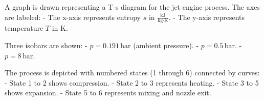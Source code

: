 A graph is drawn representing a T-s diagram for the jet engine process. The axes are labeled:  
- The x-axis represents entropy \( s \) in \( \frac{\text{kJ}}{\text{kg·K}} \).  
- The y-axis represents temperature \( T \) in \( \text{K} \).  

Three isobars are shown:  
- \( p = 0.191 \, \text{bar} \) (ambient pressure).  
- \( p = 0.5 \, \text{bar} \).  
- \( p = 8 \, \text{bar} \).  

The process is depicted with numbered states (1 through 6) connected by curves:  
- State 1 to 2 shows compression.  
- State 2 to 3 represents heating.  
- State 3 to 5 shows expansion.  
- State 5 to 6 represents mixing and nozzle exit.